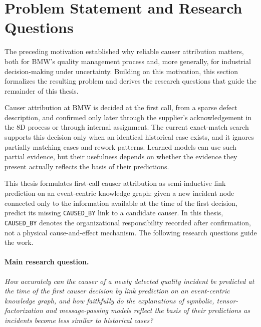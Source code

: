 \section{Problem Statement and Research Questions}\label{sec:intro_rq}

The preceding motivation established why reliable causer attribution
matters, both for BMW's quality management process and, more generally,
for industrial decision-making under uncertainty. Building on this
motivation, this section formalizes the resulting problem and derives the
research questions that guide the remainder of this thesis.

Causer attribution at BMW is decided at the first call, from a sparse defect
description, and confirmed only later through the supplier's acknowledgement
in the 8D process or through internal assignment. The current exact-match
search supports this decision only when an identical historical case exists,
and it ignores partially matching cases and rework patterns. Learned models
can use such partial evidence, but their usefulness depends on whether the
evidence they present actually reflects the basis of their predictions.

This thesis formulates first-call causer attribution as semi-inductive link
prediction on an event-centric knowledge graph: given a new incident node
connected only to the information available at the time of the first
decision, predict its missing \texttt{CAUSED\_BY} link to a candidate causer.
In this thesis, \texttt{CAUSED\_BY} denotes the organizational responsibility
recorded after confirmation, not a physical cause-and-effect mechanism. The
following research questions guide the work.

\paragraph{Main research question.}
\emph{How accurately can the causer of a newly detected quality incident be
predicted at the time of the first causer decision by link prediction on an
event-centric knowledge graph, and how faithfully do the explanations of
symbolic, tensor-factorization and message-passing models reflect the basis
of their predictions as incidents become less similar to historical
cases?}

